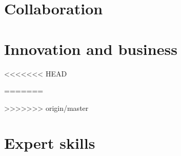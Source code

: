 
\lstset{aboveskip=0pt,belowskip=-10pt} %

\setlength{\parindent}{0pt}
\setlength{\parskip}{0.7\baselineskip}%
\thispagestyle{empty}

\clearpage
\fancyfoot{}
\fancyfoot[CO,CE]{\thepage}

% 
% 

\pagestyle{fancy}
\fancyfoot{}
\setcounter{page}{1}
\fancyfoot[LO,RE]{\thepage}

\section{Collaboration}

\newpage

 

\clearpage
\section{Innovation and business}


<<<<<<< HEAD

=======

>>>>>>> origin/master
\clearpage
\section{Expert skills}
% 

 